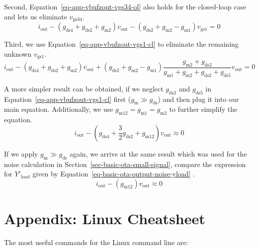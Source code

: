 \documentclass[
  a4paper,
  DIV=11,
  numbers=noendperiod]{scrartcl}
\begin{document}
Second, Equation~\ref{eq-app-vbufzout-vgs34-ol} also holds for the
closed-loop case and lets us eliminate \(v_\mathrm{gs34}\). \[
i_\mathrm{out} -\left(g_\mathrm{ds4} + g_\mathrm{ds2} + g_\mathrm{m2}\right)v_\mathrm{out} - \left(g_\mathrm{ds2} + g_\mathrm{m2} - g_\mathrm{m1}\right)v_\mathrm{gs1} = 0
\]

Third, we use Equation~\ref{eq-app-vbufzout-vgs1-cl} to eliminate the
remaining unknown \(v_\mathrm{gs1}\). \[
i_\mathrm{out} -\left(g_\mathrm{ds4} + g_\mathrm{ds2} + g_\mathrm{m2}\right)v_\mathrm{out} + \left(g_\mathrm{ds2} + g_\mathrm{m2} - g_\mathrm{m1}\right)\frac{g_\mathrm{m2}+g_\mathrm{ds2}}{g_\mathrm{m1}+g_\mathrm{m2}+g_\mathrm{ds2}+g_\mathrm{ds5}}v_\mathrm{out} = 0
\]

A more simpler result can be obtained, if we neglect \(g_\mathrm{ds2}\)
and \(g_\mathrm{ds5}\) in Equation~\ref{eq-app-vbufzout-vgs1-cl} first
(\(g_\mathrm{m}\gg g_\mathrm{ds}\)) and then plug it into our main
equation. Additionally, we use
\(g_\mathrm{m12}=g_\mathrm{m1}=g_\mathrm{m2}\) to further simplify the
equation. \[
i_\mathrm{out} -\left(g_\mathrm{ds4} + \frac{3}{2} g_\mathrm{ds2} + g_\mathrm{m12}\right)v_\mathrm{out} \approx 0
\]

If we apply \(g_\mathrm{m}\gg g_\mathrm{ds}\) again, we arrive at the
same result which was used for the noise calculation in
Section~\ref{sec-basic-ota-small-signal}, compare the expression for
\(Y'_\mathrm{load}\) given by
Equation~\ref{eq-basic-ota-output-noise-yload} . \[
i_\mathrm{out} -\left(g_\mathrm{m12}\right)v_\mathrm{out} \approx 0
\]

\section{Appendix: Linux Cheatsheet}\label{sec-linux-cheatsheet}

The most useful commands for the Linux command line are:
\end{document}
